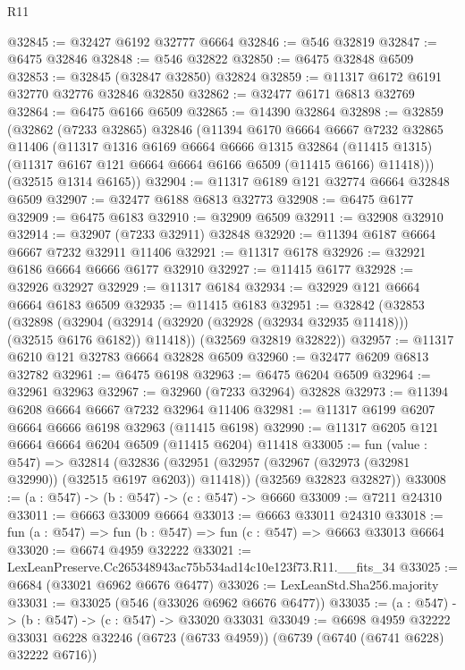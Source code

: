 \begin{lexlean}{R11}
\begin{coremodule}
@32845 := @32427 @6192 @32777 @6664
@32846 := @546 @32819
@32847 := @6475 @32846
@32848 := @546 @32822
@32850 := @6475 @32848 @6509
@32853 := @32845 (@32847 @32850) @32824
@32859 := @11317 @6172 @6191 @32770 @32776 @32846 @32850
@32862 := @32477 @6171 @6813 @32769
@32864 := @6475 @6166 @6509
@32865 := @14390 @32864
@32898 := @32859
    (@32862
      (@7233 @32865)
      @32846
      (@11394
        @6170
        @6664
        @6667
        @7232
        @32865
        @11406
        (@11317
          @1316
          @6169
          @6664
          @6666
          @1315
          @32864
          (@11415 @1315)
          (@11317 @6167 @121 @6664 @6664 @6166 @6509 (@11415 @6166) @11418)))
      (@32515 @1314 @6165))
@32904 := @11317 @6189 @121 @32774 @6664 @32848 @6509
@32907 := @32477 @6188 @6813 @32773
@32908 := @6475 @6177
@32909 := @6475 @6183
@32910 := @32909 @6509
@32911 := @32908 @32910
@32914 := @32907 (@7233 @32911) @32848
@32920 := @11394 @6187 @6664 @6667 @7232 @32911 @11406
@32921 := @11317 @6178
@32926 := @32921 @6186 @6664 @6666 @6177 @32910
@32927 := @11415 @6177
@32928 := @32926 @32927
@32929 := @11317 @6184
@32934 := @32929 @121 @6664 @6664 @6183 @6509
@32935 := @11415 @6183
@32951 := @32842
    (@32853
      (@32898
        (@32904 (@32914 (@32920 (@32928 (@32934 @32935 @11418))) (@32515 @6176 @6182)) @11418))
      (@32569 @32819 @32822))
@32957 := @11317 @6210 @121 @32783 @6664 @32828 @6509
@32960 := @32477 @6209 @6813 @32782
@32961 := @6475 @6198
@32963 := @6475 @6204 @6509
@32964 := @32961 @32963
@32967 := @32960 (@7233 @32964) @32828
@32973 := @11394 @6208 @6664 @6667 @7232 @32964 @11406
@32981 := @11317 @6199 @6207 @6664 @6666 @6198 @32963 (@11415 @6198)
@32990 := @11317 @6205 @121 @6664 @6664 @6204 @6509 (@11415 @6204) @11418
@33005 := fun (value : @547) =>
  @32814
    (@32836
      (@32951 (@32957 (@32967 (@32973 (@32981 @32990)) (@32515 @6197 @6203)) @11418))
      (@32569 @32823 @32827))
@33008 := (a : @547) -> (b : @547) -> (c : @547) -> @6660
@33009 := @7211 @24310
@33011 := @6663 @33009 @6664
@33013 := @6663 @33011 @24310
@33018 := fun (a : @547) => fun (b : @547) => fun (c : @547) => @6663 @33013 @6664
@33020 := @6674 @4959 @32222
@33021 := LexLeanPreserve.Cc265348943ac75b534ad14c10e123f73.R11.__fits_34
@33025 := @6684 (@33021 @6962 @6676 @6477)
@33026 := LexLeanStd.Sha256.majority
@33031 := @33025 (@546 (@33026 @6962 @6676 @6477))
@33035 := (a : @547) -> (b : @547) -> (c : @547) -> @33020 @33031
@33049 := @6698
    @4959
    @32222
    @33031
    @6228
    @32246
    (@6723 (@6733 @4959))
    (@6739 (@6740 (@6741 @6228) @32222 @6716))

\end{coremodule}
\end{lexlean}
